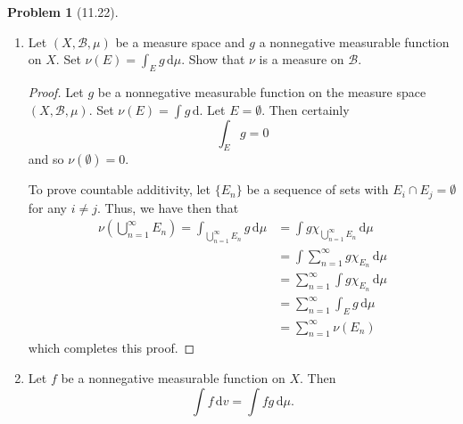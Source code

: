 \documentclass[12pt]{article}
\newcommand{\B}{\mathcal{B}}
\newcommand{\dif}{\, \mathrm{d}}
\theoremstyle{definition}
\newtheorem{problem}{Problem}
\begin{document}
\begin{problem}[11.22]

    \begin{enumerate}[label = (\alph{*})]
        \item Let \( (X, \B, \mu) \) be a measure space and \( g \) a nonnegative measurable function on \( X \). Set \( \displaystyle \nu(E) = \int_{E} g \dif \mu \). 
        Show that \( \nu \) is a measure on \( \B \).

            \begin{proof}
                Let \( g \) be a nonnegative measurable function on the measure space \( (X, \B, \mu) \). Set \( \displaystyle \nu(E) = \int g \dif  \). Let \( E = \emptyset \). Then certainly
                    \[
                        \int_{E} g  = 0
                    \]
                and so \( \nu(\emptyset) = 0 \).

                To prove countable additivity, let \( \{E_n\} \) be a sequence of sets with \( E_i \cap E_j = \emptyset \) for any \( i \neq j \). Thus, we have then that
                    \begin{align*}
                        \nu \left( \bigcup_{n=1}^{\infty} E_n \right) = \int_{\bigcup_{n=1}^{\infty} E_n} g \dif \mu &= \int g \chi_{\bigcup_{n=1}^{\infty} E_n} \dif \mu \\ 
                        &= \int \sum_{n=1}^{\infty} g \chi_{E_n} \dif \mu \\
                        &= \sum_{n=1}^{\infty} \int g \chi_{E_n} \dif \mu \\
                        &= \sum_{n=1}^{\infty} \int_{E} g \dif \mu \\
                        &= \sum_{n=1}^{\infty} \nu \left( E_n \right)
                    \end{align*}
                which completes this proof. 
            \end{proof}
        \item Let \(f \) be a nonnegative measurable function on \( X \). Then 
            \[
                \int f \dif v = \int fg \dif \mu.  
            \]


\end{enumerate}
\end{problem}
\end{document}
